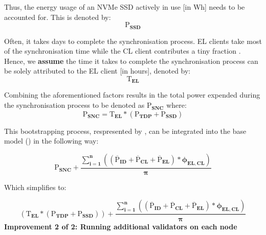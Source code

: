 Thus, the energy usage of an NVMe SSD actively in use [in Wh] needs to be accounted for. This is denoted by:
\begin{equation*}
    \boldsymbol{\mathrm{P}_{SSD} } 
\end{equation*}

Often, it takes days to complete the synchronisation process. EL clients take most of the synchronisation time while the CL client contributes a tiny fraction \cite{Ethereum/go-ethereum:Protocol}. Hence, we \textbf{assume} the time it takes to complete the synchronisation process can be solely attributed to the EL client [in hours], denoted by:
\begin{equation*}
    \boldsymbol{\mathrm{T}_{EL}}
\end{equation*}

Combining the aforementioned factors results in the total power expended during the synchronisation process to be denoted as $\boldsymbol{\mathrm{P}_{SNC}}$ where:
\begin{equation}
    \boldsymbol{\mathrm{P}_{SNC} = \mathrm{T}_{EL} * \left({\mathrm{P}_{TDP}} + \mathrm{P}_{SSD}\right)} \label{eqn:Sync}
\end{equation}

 This bootstrapping process, respresented by , can be integrated into the base model () in the following way:

\begin{equation*}
    \boldsymbol{\mathrm{P}_{SNC} +  {\frac{\displaystyle\sum\limits_{i=1}^{n}{ \left({\left(\mathrm{\overline{P}}_{ID} + \mathrm{\overline{P}}_{CL} + \mathrm{\overline{P}}_{EL}\right)} * {\phi_{EL,CL}} \right)}}
 {\pi}} } 
\end{equation*}

Which simplifies to:

\begin{equation}
     \boldsymbol{\left({\mathrm{T}_{EL} * \left({\mathrm{P}_{TDP}} + \mathrm{P}_{SSD}\right)}\right) +  {\frac{\displaystyle\sum\limits_{i=1}^{n}{ \left({\left(\mathrm{\overline{P}}_{ID} + \mathrm{\overline{P}}_{CL} + \mathrm{\overline{P}}_{EL}\right)} * {\phi_{EL,CL}} \right)}}
{\pi}} } \label{eqn:CCRISync}
\end{equation}
\label{AdditonalNodesReasoning}
\newline \newline
\textbf{ Improvement 2 of 2: Running additional validators on each node}


